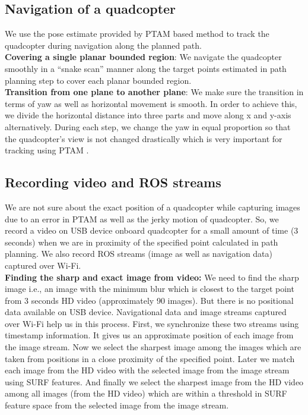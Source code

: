 \subsection{Navigation of a quadcopter}
 We use the pose estimate provided by PTAM  based method \cite{engel}to track
 the quadcopter during navigation along the planned path.\\
\textbf{Covering a single planar bounded region}:
We navigate the quadcopter smoothly in a ``snake scan'' manner along the target points estimated in path
planning step to cover each planar bounded region.\\
\textbf{Transition from one plane to another plane}: We make sure the
transition in terms of yaw as well as horizontal movement is smooth. In order to achieve this,
we divide the horizontal distance into three parts and  move along x and y-axis
alternatively. During each step, we change the yaw in equal proportion so that
the quadcopter’s view is not changed drastically which is very important for
tracking using PTAM \cite{engel}.

\subsection{Recording video and ROS streams}
 We are not sure about the exact position of a quadcopter while capturing
 images due to an error in PTAM as well as the jerky motion of quadcopter. So, we record a video on USB device onboard quadcopter for a small amount
 of time (3 seconds) when we are in proximity of the specified point calculated in path planning. We
also record ROS streams (image as well as navigation data) captured over Wi-Fi.\\
\textbf{Finding the sharp and exact image from video:} We need to find the sharp
image i.e., an image with the minimum blur which is closest to the target point
from 3 seconds HD video (approximately 90 images). But there is no positional data
available on USB device. Navigational data and image streams captured over Wi-Fi help us
in this process. First, we synchronize these two streams using timestamp
information. It gives us an approximate position of each image from the image
stream. Now we select the sharpest image among the images which are taken from
positions in a close proximity of the specified point. Later we match each
image from the HD video with the selected image from the image stream using SURF
features. And finally we select the sharpest image from the HD video among
all images (from the HD video) which are within a threshold in SURF\cite{Bay}
feature space from the selected image from the image stream.

